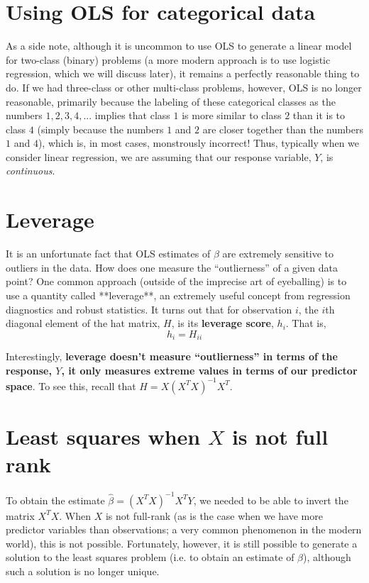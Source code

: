 \section{Using OLS for categorical data}

As a side note, although it is uncommon to use OLS to generate a linear model for two-class (binary) problems (a more modern approach is to use logistic regression, which we will discuss later), it remains a perfectly reasonable thing to do. If we had three-class or other multi-class problems, however, OLS is no longer reasonable, primarily because the labeling of these categorical classes as the numbers $1, 2, 3, 4, ...$ implies that class $1$ is more similar to class $2$ than it is to class $4$ (simply because the numbers $1$ and $2$ are closer together than the numbers $1$ and $4$), which is, in most cases, monstrously incorrect! Thus, typically when we consider linear regression, we are assuming that our response variable, $Y$, is \textit{continuous}.



\section{Leverage}


It is an unfortunate fact that OLS estimates of $\beta$ are extremely sensitive to outliers in the data. How does one measure the ``outlierness'' of a given data point? One common approach (outside of the imprecise art of eyeballing) is to use a quantity called **leverage**, an extremely useful concept from regression diagnostics and robust statistics. It turns out that for observation $i$, the $i$th diagonal element of the hat matrix, $H$, is its {\bf leverage score}, $h_i$. That is,
$$h_i = H_{ii}$$

Interestingly, {\bf leverage doesn't measure ``outlierness'' in terms of the response, $Y$, it only measures extreme values in terms of our predictor space}. To see this, recall that $H =  X\left(X^TX\right)^{-1}X^T$.





\section{Least squares when $X$ is not full rank}

To obtain the estimate $\hat{\beta} = \left(X^TX\right)^{-1}X^T Y$, we needed to be able to invert the matrix $X^TX$. When $X$ is not full-rank (as is the case when we have more predictor variables than observations; a very common phenomenon in the modern world), this is not possible. Fortunately, however, it is still possible to generate a solution to the least squares problem (i.e. to obtain an estimate of $\beta$), although such a solution is no longer unique.  


